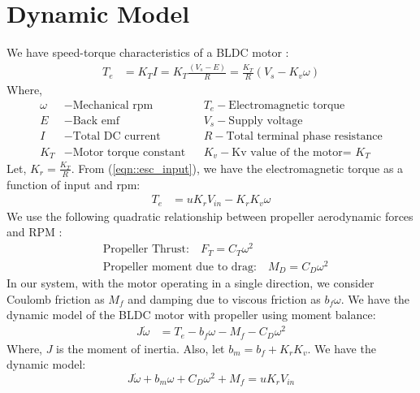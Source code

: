 \section{Dynamic Model}


We have speed-torque characteristics of a BLDC motor \cite{crowder2019electric}:
\begin{align}
    T_e &= K_T I = K_T \frac{(V_s - E)}{R} = \frac{K_T}{R} (V_s - K_v \omega)
\end{align}
Where,
\begin{align*}
    \omega &- \text{Mechanical rpm} & &
    T_e      - \text{Electromagnetic torque}\\
    E        &- \text{Back emf} & &
    V_s      - \text{Supply voltage}\\
    I        &- \text{Total DC current}& &
    R        - \text{Total terminal phase resistance}\\
    K_T      &- \text{Motor torque constant} & &
    K_v      - \text{Kv value of the motor= $K_T$}
\end{align*}
Let, $K_r = \frac{K_T}{R}$.
From (\ref{eqn::esc_input}), we have the electromagnetic torque as a function
of input and rpm:
\begin{align}\label{eqn::Te}
    T_e &= u K_r V_{in} - K_r K_v \omega
\end{align}
We use the following quadratic relationship between propeller aerodynamic forces
and RPM \cite{pounds2010modelling}:
\begin{align}
    &\text{Propeller Thrust:}\quad
    F_T = C_{T} \omega^2\\
    &\text{Propeller moment due to drag:}\quad
    M_D = C_{D} \omega^2
\end{align}
In our system, with the motor operating in a single direction, we consider
Coulomb friction as $M_f$ and damping due to viscous friction as $b_f\omega$.
We have the dynamic model of the BLDC motor with propeller using moment balance:
\begin{align}
    J \dot \omega &= T_e - b_f \omega - M_f - C_D \omega^2
\end{align}
Where, $J$ is the moment of inertia. Also, let $b_m = b_f + K_rK_v$. We have the dynamic model:
\begin{equation}\label{eqn:dyn_mdl}
    J\dot \omega + b_m \omega + C_D \omega^2 + M_f = u K_r V_{in}
\end{equation}




